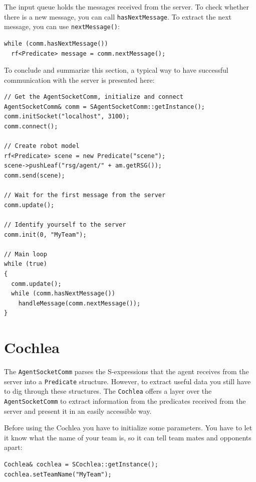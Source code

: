 The input queue holds the messages received from the server. To check
whether there is a new message, you can call {\tt hasNextMessage}. To
extract the next message, you can use {\tt nextMessage()}:
\begin{lstlisting}[frame=single]
while (comm.hasNextMessage())
  rf<Predicate> message = comm.nextMessage();
\end{lstlisting}

To conclude and summarize this section, a typical way to have
successful communication with the server is presented here:
\begin{lstlisting}[frame=single]
// Get the AgentSocketComm, initialize and connect
AgentSocketComm& comm = SAgentSocketComm::getInstance();
comm.initSocket("localhost", 3100);
comm.connect();

// Create robot model
rf<Predicate> scene = new Predicate("scene");
scene->pushLeaf("rsg/agent/" + am.getRSG());
comm.send(scene);

// Wait for the first message from the server
comm.update();

// Identify yourself to the server
comm.init(0, "MyTeam");

// Main loop
while (true)
{
  comm.update();
  while (comm.hasNextMessage())
    handleMessage(comm.nextMessage());
}
\end{lstlisting}

\section{Cochlea}
\label{secCochlea}

\lstset{numbers=none}

The {\tt AgentSocketComm} parses the S-expressions that the agent
receives from the server into a {\tt Predicate} structure. However, to
extract useful data you still have to dig through these
structures. The {\tt Cochlea} offers a layer over the {\tt
  AgentSocketComm} to extract information from the predicates received
from the server and present it in an easily accessible way.

Before using the Cochlea you have to initialize some parameters. You
have to let it know what the name of your team is, so it can tell team
mates and opponents apart:
\begin{lstlisting}[frame=single]
Cochlea& cochlea = SCochlea::getInstance();
cochlea.setTeamName("MyTeam");
\end{lstlisting}

